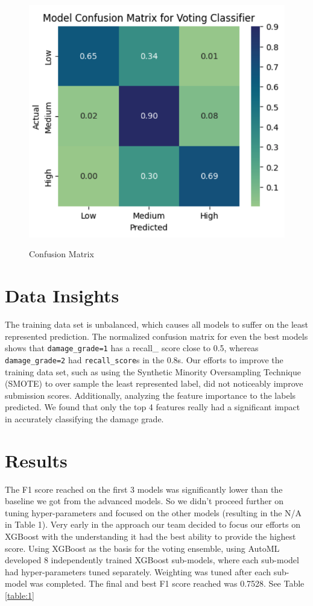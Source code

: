 \documentclass{article}
\begin{document}
\begin{figure}
            \centering
            \caption{Confusion Matrix}
            \includegraphics[scale=0.5]{matrix.png}
            \label{fig:matrix}
\end{figure}




\section{Data Insights}
The training data set is unbalanced, which causes all models to suffer on the least represented prediction.
The normalized confusion matrix for even the best models shows that \texttt{damage\_grade=1} has a recall\_ score close to 0.5, whereas \texttt{damage\_grade=2} had \texttt{recall\_score}s in the 0.8s.
Our efforts to improve the training data set, such as using the Synthetic Minority Oversampling Technique (SMOTE) to over sample the least represented label, did not noticeably improve submission scores.
Additionally, analyzing the feature importance to the labels predicted. We found that only the top 4 features really had a significant impact in accurately classifying the damage grade.

\section{Results}

The F1 score reached on the first 3 models was significantly lower than the baseline we got from the advanced models. So we didn't proceed further on tuning hyper-parameters and focused on the other models (resulting in the N/A in Table 1).
Very early in the approach our team decided to focus our efforts on XGBoost with the understanding it had the best ability to provide the highest score. Using XGBoost as the basis for the voting ensemble, using AutoML developed  8 independently trained XGBoost sub-models, where each sub-model had hyper-parameters tuned separately.
Weighting was tuned after each sub-model was completed. The final and best F1 score reached was 0.7528. See Table \ref{table:1}
\end{document}
